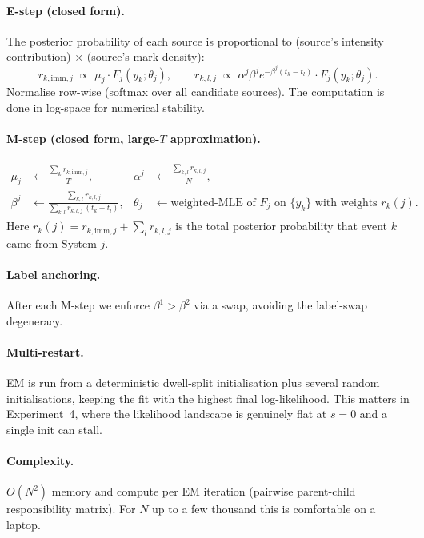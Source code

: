 \documentclass[11pt]{article}
\begin{document}
\paragraph{E-step (closed form).} The posterior probability of each source is proportional to (source's intensity contribution) × (source's mark density):
\[
r_{k,\mathrm{imm},j} \;\propto\; \mu_j \cdot F_j(y_k; \theta_j), \qquad
r_{k,l,j} \;\propto\; \alpha^j \beta^j e^{-\beta^j(t_k - t_l)} \cdot F_j(y_k; \theta_j).
\]
Normalise row-wise (softmax over all candidate sources). The computation is done in log-space for numerical stability.

\paragraph{M-step (closed form, large-$T$ approximation).}
\begin{align*}
\mu_j &\leftarrow \frac{\sum_k r_{k,\mathrm{imm},j}}{T}, &
\alpha^j &\leftarrow \frac{\sum_{k,l} r_{k,l,j}}{N}, \\
\beta^j &\leftarrow \frac{\sum_{k,l} r_{k,l,j}}{\sum_{k,l} r_{k,l,j}\,(t_k - t_l)}, &
\theta_j &\leftarrow \text{weighted-MLE of $F_j$ on $\{y_k\}$ with weights } r_k(j).
\end{align*}
Here $r_k(j) = r_{k,\mathrm{imm},j} + \sum_l r_{k,l,j}$ is the total posterior probability that event $k$ came from System-$j$.

\paragraph{Label anchoring.} After each M-step we enforce $\beta^1 > \beta^2$ via a swap, avoiding the label-swap degeneracy.

\paragraph{Multi-restart.} EM is run from a deterministic dwell-split initialisation plus several random initialisations, keeping the fit with the highest final log-likelihood. This matters in Experiment~4, where the likelihood landscape is genuinely flat at $s = 0$ and a single init can stall.

\paragraph{Complexity.} $O(N^2)$ memory and compute per EM iteration (pairwise parent-child responsibility matrix). For $N$ up to a few thousand this is comfortable on a laptop.
\end{document}
